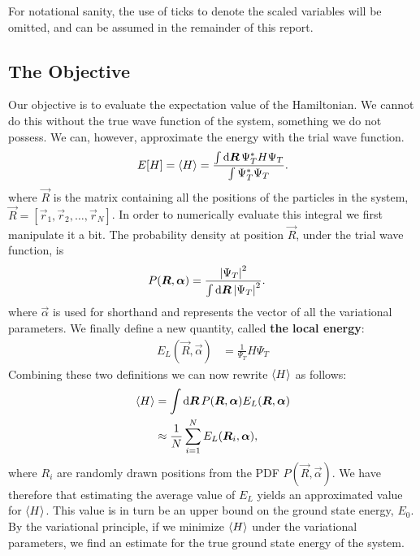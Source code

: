 \documentclass[twocolumn]{article}
\begin{document}
For notational sanity, the use of ticks to denote the scaled variables will be
omitted, and can be assumed in the remainder of this report. 



\subsection{The Objective}
Our objective is to evaluate the expectation value of the Hamiltonian. We cannot do this
without the true wave function of the system, something we do not possess.
We can, however, approximate the energy with the trial wave function.
\begin{align}
    E[H] = \expval{H} = \frac{\int \dd{\bm R} \Psi^*_T H \Psi_T}{\int
    \Psi_T^*\Psi_T}.
\end{align}
where $\vec R$ is the matrix containing all the positions of the particles in
the system, $\vec R = [\vec r_1, \vec r_2, \dots, \vec r_N]$.
In order to numerically evaluate this integral we first manipulate it a bit.
The probability density at position $\vec R$, under the trial wave function, is
\begin{align}
    P(\bm R, \bm \alpha) &= \frac{\abs{\Psi_T}^2}{\int \dd{\bm R}\abs{\Psi_T}^2}.
\end{align}
where $\vec \alpha$ is used for shorthand and represents the vector of all the variational parameters.
We finally define a new quantity, called \textbf{the local energy}:
\begin{align}
    E_L(\vec R, \vec \alpha) &= \frac{1}{\Psi_T}H\Psi_T\label{eq:E_L}
\end{align}
Combining these two definitions we can now rewrite $\expval{H}$ as follows:
\begin{align}
    \begin{split}
        \expval{H} &= \int \dd{\bm R} P(\bm R,\bm\alpha) E_L(\bm R,\bm\alpha)\\
        &\approx
        \frac{1}{N}\sum_{i=1}^N E_L(\bm R_i,\bm\alpha),
    \end{split}\label{eq:the-objective}
\end{align}
where $R_i$ are randomly drawn positions from the PDF $P(\vec R, \vec\alpha)$.
We have therefore that estimating the average value of $E_L$ yields an
approximated value for $\expval{H}$. This value is in turn be an upper bound on the
ground state energy, $E_0$. By the variational principle, if we minimize
$\expval{H}$ under the variational parameters, we find an estimate for the true
ground state energy of the system.
\end{document}
